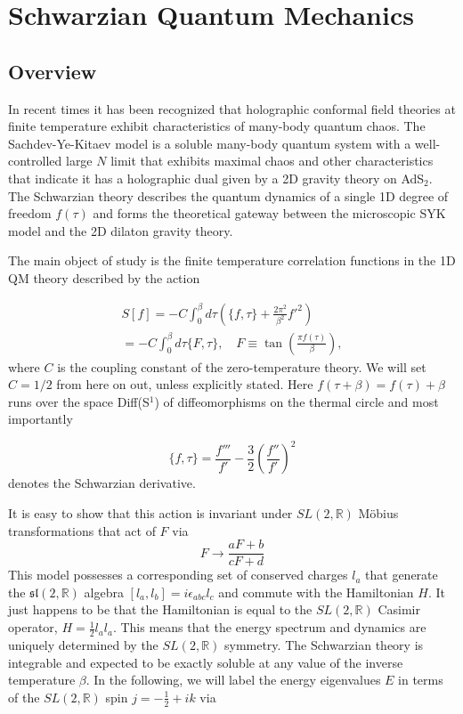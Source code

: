 \chapter{Schwarzian Quantum Mechanics}
\adjustmtc
\minitoc
\section{Overview}
In recent times it has been recognized that holographic conformal field theories at finite temperature exhibit characteristics of many-body quantum chaos. The Sachdev-Ye-Kitaev model\cite{SYK93} is a soluble many-body quantum system with a well-controlled large $N$ limit that exhibits maximal chaos and other characteristics that indicate it has a holographic dual given by a 2D gravity theory on AdS$_2$.\cite{Maldacena16,Polchinski16} The Schwarzian theory describes the quantum dynamics of a single 1D degree of freedom $f(\tau)$ and forms the theoretical gateway between the microscopic SYK model and the 2D dilaton gravity theory.

The main object of study is the finite temperature correlation functions in the 1D QM theory described by the action\cite{Mertens17}

\begin{gather}
S[f] = -C \int_0^\beta{d\tau\left(\{f,\tau\}+\frac{2\pi^2}{\beta^2}f'^2\right)}\\
= -C\int_0^\beta{d\tau\{F,\tau\}}, \quad F\equiv \tan\left(\frac{\pi f(\tau)}{\beta}\right),
\label{eq:schwarzaction}
\end{gather}
where $C$ is the coupling constant of the zero-temperature theory. We will set $C=1/2$ from here on out, unless explicitly stated. Here $f(\tau+\beta) = f(\tau)+\beta$ runs over the space Diff(S$^1$) of diffeomorphisms on the thermal circle and most importantly

\begin{equation}
\{f,\tau\} = \frac{f'''}{f'} - \frac{3}{2}\left(\frac{f''}{f'}\right)^2
\end{equation}
denotes the Schwarzian derivative.

It is easy to show that this action is invariant under $SL(2,\mathbb{R})$ Möbius transformations that act of $F$ via
\begin{equation}
F\rightarrow\frac{aF+b}{cF+d}
\end{equation}
This model possesses a corresponding set of conserved charges $l_a$ that generate the $\mathfrak{sl}(2,\mathbb{R})$ algebra $[l_a,l_b] = i\epsilon_{abc}l_c$ and commute with the Hamiltonian $H$. It just happens to be  that the Hamiltonian is equal to the $SL(2,\mathbb{R})$ Casimir operator, $H=\frac{1}{2}l_al_a$. This means that the energy spectrum and dynamics are uniquely determined by the $SL(2,\mathbb{R})$ symmetry. The Schwarzian theory is integrable and expected to be exactly soluble at any value of the inverse temperature $\beta$. In the following, we will label the energy eigenvalues $E$ in terms of the $SL(2,\mathbb{R})$ spin $j=-\frac{1}{2}+ik$ via

